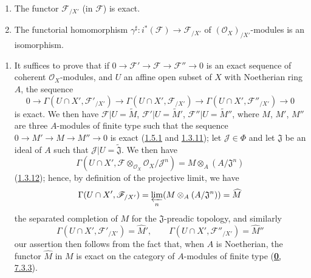\begin{proposition}[10.8.8]
\label{I.10.8.8}
\medskip\noindent
\begin{enumerate}
  \item[\rm{(i)}] The functor $\mathscr{F}_{/X'}$ (in $\mathscr{F}$) is
    exact.
  \item[\rm{(ii)}] The functorial homomorphism
    $\gamma^\sharp:i^*(\mathscr{F})\to\mathscr{F}_{/X'}$ of
    $(\mathscr{O}_X)_{/X'}$-modules is an isomorphism.
\end{enumerate}
\end{proposition}

\medskip\noindent
\begin{enumerate}
  \item[\rm{(i)}] It suffices to prove that if
    $0\to\mathscr{F}'\to\mathscr{F}\to\mathscr{F}''\to0$ is an exact
    sequence of coherent $\mathscr{O}_X$-modules, and $U$ an affine
    open subset of $X$ with Noetherian ring $A$, the sequence
    \[
      0\to\Gamma(U\cap X',\mathscr{F}'_{/X'})
      \to\Gamma(U\cap X',\mathscr{F}_{/X'})
      \to\Gamma(U\cap X',\mathscr{F}''_{/X'})\to0
    \]
    is exact. We then have $\mathscr{F}|U=\widetilde M$,
    $\mathscr{F}'|U=\widetilde{M}'$, $\mathscr{F}''|U=\widetilde{M}''$,
    where $M$, $M'$, $M''$ are three $A$-modules of finite type such that
    the sequence $0\to M'\to M\to M''\to0$ is exact
    (\hyperref[I.1.5.1]{1.5.1} and
    \hyperref[I.1.3.11]{1.3.11}); let $\mathscr{J}\in\Phi$ and let
    $\mathfrak{J}$ be an ideal of $A$ such that
    $\mathscr{J}|U=\widetilde{\mathfrak{J}}$. We then have
    \[
      \Gamma(U\cap X',
      \mathscr{F}\otimes_{\mathscr{O}_X}\mathscr{O}_X/\mathscr{J}^n)
      =M\otimes_A(A/\mathfrak{J}^n)
    \]
    (\hyperref[I.1.3.12]{1.3.12}); hence, by definition of the
    projective limit, we have
    \[
      \Gamma(U\cap X',\mathscr{F}_{/X'})
      =\varprojlim_n(M\otimes_A(A/\mathfrak{J}^n))=\widehat M
    \]
    the separated completion of $M$ for the $\mathfrak{J}$-preadic
    topology, and similarly
    \[
      \Gamma(U\cap X',\mathscr{F}'_{/X'})=\widehat{M}',\qquad
      \Gamma(U\cap X',\mathscr{F}''_{/X'})=\widehat{M}''
    \]
    our assertion then follows from the fact that, when $A$ is
    Noetherian, the functor $\widehat M$ in $M$ is exact on the category
    of $A$-modules of finite type (\hyperref[0.7.3.3]{\textbf{0}, 7.3.3}).


\end{enumerate}
